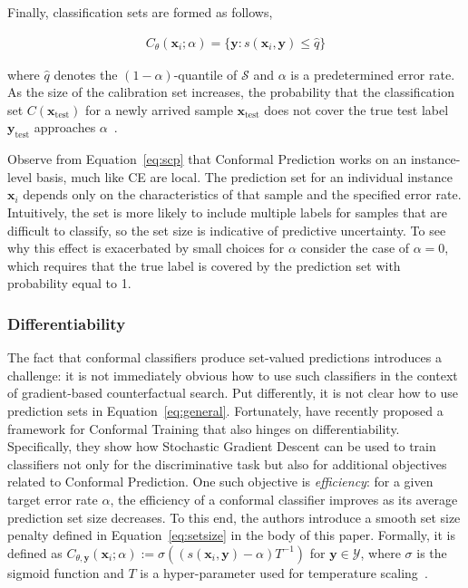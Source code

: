 \documentclass{article}
\begin{document}
Finally, classification sets are formed as follows,

\begin{equation}\label{eq:scp}
  \begin{aligned}
    C_{\theta}(\mathbf{x}_i;\alpha)=\{\mathbf{y}: s(\mathbf{x}_i,\mathbf{y}) \le \hat{q}\}
  \end{aligned}
\end{equation}

where $\hat{q}$ denotes the $(1-\alpha)$-quantile of $\mathcal{S}$ and $\alpha$ is a predetermined error rate. As the size of the calibration set increases, the probability that the classification set $C(\mathbf{x}_{\text{test}})$ for a newly arrived sample $\mathbf{x}_{\text{test}}$ does not cover the true test label $\mathbf{y}_{\text{test}}$ approaches $\alpha$~\citep{angelopoulos2021gentle}. 

Observe from Equation~\ref{eq:scp} that Conformal Prediction works on an instance-level basis, much like CE are local. The prediction set for an individual instance $\mathbf{x}_i$ depends only on the characteristics of that sample and the specified error rate. Intuitively, the set is more likely to include multiple labels for samples that are difficult to classify, so the set size is indicative of predictive uncertainty. To see why this effect is exacerbated by small choices for $\alpha$ consider the case of $\alpha=0$, which requires that the true label is covered by the prediction set with probability equal to 1.

\subsubsection{Differentiability}

The fact that conformal classifiers produce set-valued predictions introduces a challenge: it is not immediately obvious how to use such classifiers in the context of gradient-based counterfactual search. Put differently, it is not clear how to use prediction sets in Equation~\ref{eq:general}. Fortunately, \citet{stutz2022learning} have recently proposed a framework for Conformal Training that also hinges on differentiability. Specifically, they show how Stochastic Gradient Descent can be used to train classifiers not only for the discriminative task but also for additional objectives related to Conformal Prediction. One such objective is \textit{efficiency}: for a given target error rate $\alpha$, the efficiency of a conformal classifier improves as its average prediction set size decreases. To this end, the authors introduce a smooth set size penalty defined in Equation~\ref{eq:setsize} in the body of this paper. Formally, it is defined as $C_{\theta,\mathbf{y}}(\mathbf{x}_i;\alpha):=\sigma\left((s(\mathbf{x}_i,\mathbf{y})-\alpha) T^{-1}\right)$ for $\mathbf{y}\in\mathcal{Y}$, where $\sigma$ is the sigmoid function and $T$ is a hyper-parameter used for temperature scaling~\citep{stutz2022learning}.
\end{document}
